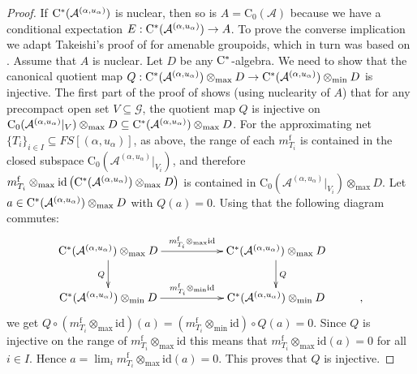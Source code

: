\documentclass[11 pt, leqno]{amsart}
\numberwithin{equation}{section}
\theoremstyle{plain}
\theoremstyle{definition}
\newcommand*{\contz}{\mathrm{C_0}}%
\DeclareMathOperator{\f}{f}%
\newcommand{\m}{m}
\newcommand{\G}{\mathcal G} %
\newcommand{\A}{\mathcal A}
\newcommand{\cst}{\ifmmode\mathrm{C}^*\else{$\mathrm{C}^*$}\fi}
\begin{document}
\begin{proof}
If $\cst(\A^{(\alpha,u_{\alpha})})$ is nuclear, then so is $A = \contz(\A)$ because we have a conditional expectation $E:\cst(\A^{(\alpha,u_{\alpha})})\to A$. 
To prove the converse implication we adapt Takeishi's proof of \cite[Theorem 4.1]{Takeishi} for amenable groupoids, which in turn was based on \cite[Theorem 5.6.18]{BO}. 
Assume that $A$ is nuclear. 
Let $D$ be any $\cst$-algebra.  
We need to show that the canonical quotient map $Q : \cst(\A^{(\alpha,u_{\alpha})}) \otimes_{\max} D \rightarrow \cst(\A^{(\alpha,u_{\alpha})})\otimes_{\min} D$ is injective. 
The first part of the proof of \cite[Theorem 4.1]{Takeishi} shows (using nuclearity of $A$) that for any precompact open set $V\subseteq \G$, the quotient map $Q$ is injective on   $\contz(\A^{(\alpha,u_{\alpha})}|_{V})\otimes_{\max} D\subseteq \cst(\A^{(\alpha,u_{\alpha})}) \otimes_{\max} D$.
For the approximating net $\{ T_{i} \}_{i\in I} \subseteq  FS[(\alpha,u_{\alpha})]$, as above, the range of each $\m_{T_i}^{\f}$ is contained in the closed subspace $\contz(\A^{(\alpha,u_{\alpha})}|_{V_i})$, and therefore ${\m}_{T_i}^{\f} \otimes_{\max} \mathrm{id} \left( {\cst}(\A^{(\alpha,u_{\alpha})}) \otimes_{\max}D \right)$ is contained in $\contz(\A^{(\alpha,u_{\alpha})}|_{V_i})\otimes_{\max} D$.  
Let $a \in {\cst}(\A^{(\alpha,u_{\alpha})})\otimes_{\max} D$ with $Q(a)=0$. 
Using that the following  diagram commutes: 
\[
\xymatrix{
    {\cst}(\A^{(\alpha,u_{\alpha})}) \otimes_{\max}  D\ar[d]_{Q} \ar[rr]^{{\m}_{T_i}^{\f} \otimes_{\max} \mathrm{id}} & & {\cst}(\A^{(\alpha,u_{\alpha})}) \otimes_{\max} D \ar[d]^{Q} & 
        \\
    {\cst}(\A^{(\alpha,u_{\alpha})}) \otimes_{\min} D \ar[rr]^{{\m}_{T_i}^{\f} \otimes_{\min} \mathrm{id}} & & {\cst}(\A^{(\alpha,u_{\alpha})})\otimes_{\min} D &,}
\]
we get $Q\circ ({\m}_{T_i}^{\f} \otimes_{\max} \mathrm{id})(a) = ({\m}_{T_i}^{\f} \otimes_{\min} \mathrm{id})\circ Q(a) = 0$. 
Since $Q$ is injective on the range of ${\m}_{T_i}^{\f}\otimes_{\max} \mathrm{id}$ this means that ${\m}_{T_i}^{\f} \otimes_{\max} \mathrm{id}(a)=0$ for all $i\in I$. 
Hence $a = \lim_i{\m}_{T_i}^{\f} \otimes_{\max} \mathrm{id}(a)=0$. 
This proves that $Q$ is injective. 
\end{proof}
\end{document}
